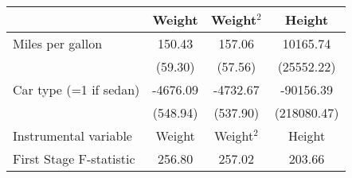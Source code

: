 \begin{tabular}{lccc}
\toprule
 & Weight & Weight$^2$ & Height \\
\midrule
Miles per gallon & 150.43 & 157.06 & 10165.74 \\
  & (59.30) & (57.56) & (25552.22) \\
Car type (=1 if sedan) & -4676.09 & -4732.67 & -90156.39 \\
  & (548.94) & (537.90) & (218080.47) \\
\midrule Instrumental variable & Weight & Weight$^2$ & Height \\
First Stage F-statistic & 256.80 & 257.02 & 203.66 \\
\bottomrule
\end{tabular}
